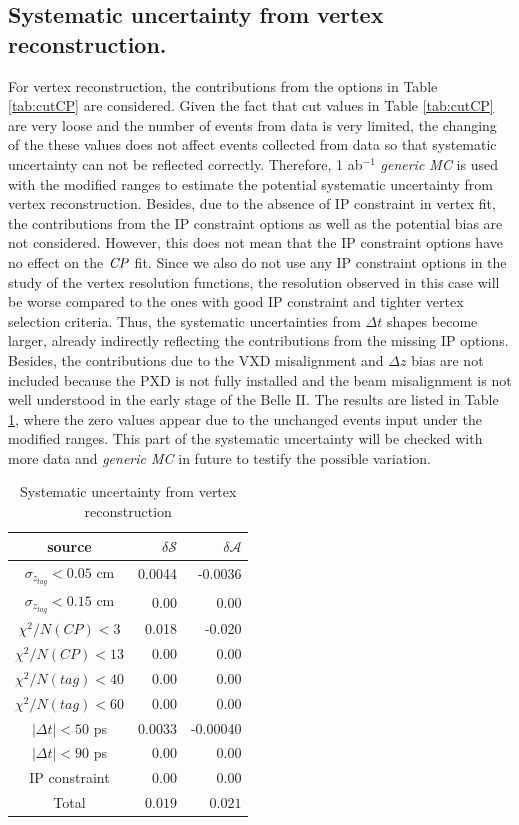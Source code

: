 \subsection{Systematic uncertainty from vertex reconstruction.}
For vertex reconstruction, the contributions from the options in Table \ref{tab:cutCP} are considered. Given the fact that cut values in Table \ref{tab:cutCP} are very loose and the number of events from data is very limited, the changing of the these values does not affect events collected from data so that systematic uncertainty can not be reflected correctly. Therefore, 1 ab$^{-1}$ \textit{generic MC} is used with the modified ranges to estimate the potential systematic uncertainty from vertex reconstruction. Besides, due to the absence of IP constraint in vertex fit, the contributions from the IP constraint options as well as the potential bias are not considered. However, this does not mean that the IP constraint options have no effect on the $\it{CP}$ fit. Since we also do not use any IP constraint options in the study of the vertex resolution functions, the resolution observed in this case will be worse compared to the ones with good IP constraint and tighter vertex selection criteria. Thus, the systematic uncertainties from $\Delta t$ shapes become larger, already indirectly reflecting the contributions from the missing IP options. Besides, the contributions due to the VXD misalignment and $\Delta z$ bias are not included because the PXD is not fully installed and the beam misalignment is not well understood in the early stage of the Belle II.
The results are listed in Table \ref{tab:sy_vertex}, where the zero values appear due to the unchanged events input under the modified ranges. This part of the systematic uncertainty will be checked with more data and \textit{generic MC} in future to testify the possible variation.

\begin{table}[htpb]
	\begin{minipage}[b]{1.0\linewidth}
		\centering
		\caption{Systematic uncertainty from vertex reconstruction}
		\label{tab:sy_vertex}
		\begin{tabular}{c r r}
			\hline
			source & $\delta \mathcal{S}$ & $\delta \mathcal{A}$ \\
			\hline
			$\sigma_{z_{tag}}<0.05$ cm & 0.0044
& -0.0036
\\
			$\sigma_{z_{tag}}<0.15$ cm & 0.00 & 0.00 \\
			$\chi^2/N(CP)<3$ & 0.018
& -0.020
\\
			$\chi^2/N(CP)<13$ & 0.00 & 0.00\\
			$\chi^2/N(tag)<40$ & 0.00
& 0.00
\\
			$\chi^2/N(tag)<60$ & 0.00 & 0.00\\
			$|\Delta t|<50 $ ps & 0.0033
& -0.00040
\\
			$|\Delta t|<90 $ ps & 0.00 & 0.00\\
			IP constraint & 0.00& 0.00\\
						\hline
							Total &
						{$0.019$} &
						{$0.021$}\\
\hline
		\end{tabular}
	\end{minipage}
\end{table}

